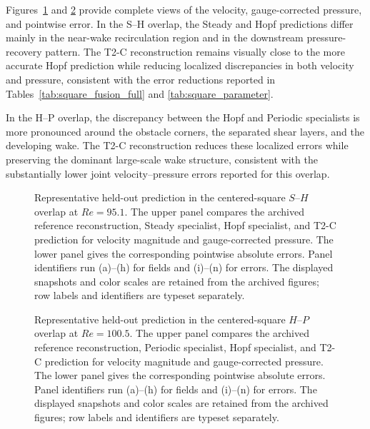 Figures~\ref{fig:app_square_sh_full} and \ref{fig:app_square_hp_full} provide complete views of the velocity, gauge-corrected pressure, and pointwise error. In the S--H overlap, the Steady and Hopf predictions differ mainly in the near-wake recirculation region and in the downstream pressure-recovery pattern. The T2-C reconstruction remains visually close to the more accurate Hopf prediction while reducing localized discrepancies in both velocity and pressure, consistent with the error reductions reported in Tables~\ref{tab:square_fusion_full} and \ref{tab:square_parameter}.

In the H--P overlap, the discrepancy between the Hopf and Periodic specialists is more pronounced around the obstacle corners, the separated shear layers, and the developing wake. The T2-C reconstruction reduces these localized errors while preserving the dominant large-scale wake structure, consistent with the substantially lower joint velocity--pressure errors reported for this overlap.

\par
\begin{figure}[p]
\centering
{}

\vspace{0.35em}
\caption{Representative held-out prediction in the centered-square
$S$--$H$ overlap at $Re=95.1$. The upper panel compares the archived reference reconstruction,
Steady specialist, Hopf specialist, and T2-C prediction for velocity
magnitude and gauge-corrected pressure. The lower panel gives the
corresponding pointwise absolute errors. Panel identifiers run (a)--(h) for fields and (i)--(n) for errors. The displayed snapshots and color scales are retained from the archived figures; row labels and identifiers are typeset separately.}
\label{fig:app_square_sh_full}
\end{figure}
\par

\par
\begin{figure}[p]
\centering
{}

\vspace{0.35em}
\caption{Representative held-out prediction in the centered-square
$H$--$P$ overlap at $Re=100.5$. The upper panel compares the archived reference reconstruction, Periodic specialist, Hopf specialist, and T2-C prediction for velocity magnitude and gauge-corrected pressure. The lower panel gives the
corresponding pointwise absolute errors. Panel identifiers run (a)--(h) for fields and (i)--(n) for errors. The displayed snapshots and color scales are retained from the archived figures; row labels and identifiers are typeset separately.}
\label{fig:app_square_hp_full}
\end{figure}
\par


